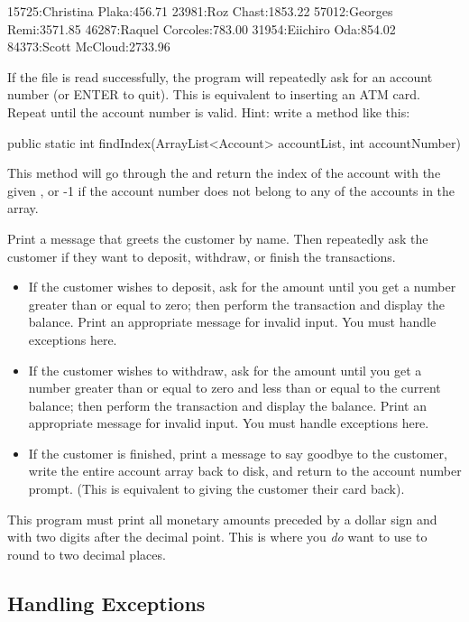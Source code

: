 \begin{exercise}
\begin{stdout}
15725:Christina Plaka:456.71
23981:Roz Chast:1853.22
57012:Georges Remi:3571.85
46287:Raquel Corcoles:783.00
31954:Eiichiro Oda:854.02
84373:Scott McCloud:2733.96
\end{stdout}

If the file is read successfully, the program will repeatedly ask for an account number (or ENTER to quit). This is equivalent to inserting an ATM card. Repeat until the account number is valid. Hint: write a method like this:

\begin{stdout}
public static int findIndex(ArrayList<Account> accountList,
   int accountNumber)
\end{stdout}

This method will go through the  and return the index of the account with the given , or -1 if the account number does not belong to any of the accounts in the array.

Print a message that greets the customer by name. Then repeatedly ask the customer if they want to deposit, withdraw, or finish the transactions.

\begin{itemize}
    \item If the customer wishes to deposit, ask for the amount until you get a number greater than or equal to zero; then perform the transaction and display the balance. Print an appropriate message for invalid input. You must handle exceptions here.
    \item If the customer wishes to withdraw, ask for the amount until you get a number greater than or equal to zero and less than or equal to the current balance; then perform the transaction and display the balance. Print an appropriate message for invalid input. You must handle exceptions here.
    \item If the customer is finished, print a message to say goodbye to the customer, write the entire account array back to disk, and return to the account number prompt. (This is equivalent to giving the customer their card back).
\end{itemize}

This program must print all monetary amounts preceded by a dollar sign and with two digits after the decimal point. This is where you {\em do} want to use  to round to two decimal places.

\subsection*{Handling Exceptions}


\end{exercise}
